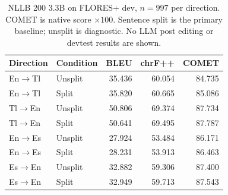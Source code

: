 \begin{table}[t]
\centering
\small
\begin{tabular}{llrrr}
\toprule
Direction & Condition & BLEU & chrF++ & COMET \\
\midrule
En$\to$Tl & Unsplit & 35.436 & 60.054 & 84.735 \\
En$\to$Tl & Split & 35.820 & 60.665 & 85.086 \\
Tl$\to$En & Unsplit & 50.806 & 69.374 & 87.734 \\
Tl$\to$En & Split & 50.641 & 69.495 & 87.787 \\
En$\to$Es & Unsplit & 27.924 & 53.484 & 86.171 \\
En$\to$Es & Split & 28.231 & 53.913 & 86.463 \\
Es$\to$En & Unsplit & 32.882 & 59.306 & 87.400 \\
Es$\to$En & Split & 32.949 & 59.713 & 87.543 \\
\bottomrule
\end{tabular}
\caption{NLLB 200 3.3B on FLORES+ dev, $n=997$ per direction. COMET is native score $\times100$. Sentence split is the primary baseline; unsplit is diagnostic. No LLM post editing or devtest results are shown.}
\label{tab:phase3-dev-baselines}
\end{table}
